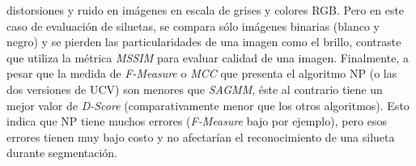 distorsiones y ruido en imágenes en escala de grises y colores RGB. Pero en este caso de evaluación de siluetas, se compara sólo imágenes binarias (blanco y negro) y se pierden las particularidades de una imagen como el brillo, contraste que utiliza la métrica \textit{MSSIM} para evaluar calidad de una imagen. Finalmente, a pesar que la medida de \textit{F-Measure} o \textit{MCC} que presenta el algoritmo NP (o las dos versiones de UCV) son menores que \textit{SAGMM}, éste al contrario tiene un mejor valor de \textit{D-Score} (comparativamente menor que los otros algoritmos). Esto indica que NP tiene muchos errores (\textit{F-Measure} bajo por ejemplo), pero esos errores tienen muy bajo costo y no afectarían el reconocimiento de una silueta durante segmentación.






